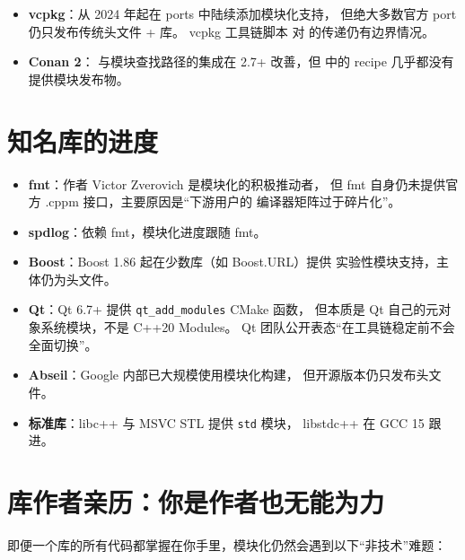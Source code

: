\documentclass[12pt,a4paper,fontset=fandol]{ctexbook}
\begin{document}
\begin{itemize}
  \item \textbf{vcpkg}：从 2024 年起在 ports 中陆续添加模块化支持，
        但绝大多数官方 port 仍只发布传统头文件 + 库。
        vcpkg 工具链脚本 
        对 
        的传递仍有边界情况。
  \item \textbf{Conan 2}：
        与模块查找路径的集成在 2.7+ 改善，但
        中的 recipe 几乎都没有提供模块发布物。
\end{itemize}

\section{知名库的进度}

\begin{itemize}
  \item \textbf{fmt}：作者 Victor Zverovich 是模块化的积极推动者，
        但 fmt 自身仍未提供官方 .cppm 接口，主要原因是“下游用户的
        编译器矩阵过于碎片化”。
  \item \textbf{spdlog}：依赖 fmt，模块化进度跟随 fmt。
  \item \textbf{Boost}：Boost 1.86 起在少数库（如 Boost.URL）提供
        实验性模块支持，主体仍为头文件。
  \item \textbf{Qt}：Qt 6.7+ 提供 \texttt{qt\_add\_modules} CMake 函数，
        但本质是 Qt 自己的元对象系统模块，不是 C++20 Modules。
        Qt 团队公开表态“在工具链稳定前不会全面切换”。
  \item \textbf{Abseil}：Google 内部已大规模使用模块化构建，
        但开源版本仍只发布头文件。
  \item \textbf{标准库}：libc++ 与 MSVC STL 提供 \texttt{std} 模块，
        libstdc++ 在 GCC 15 跟进。
\end{itemize}

\section{库作者亲历：你是作者也无能为力}

即便一个库的所有代码都掌握在你手里，模块化仍然会遇到以下“非技术”难题：
\end{document}

